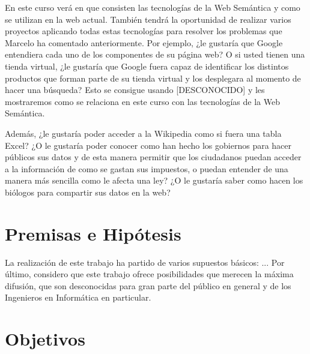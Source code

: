 
En este curso verá en que consisten las tecnologías de la Web Semántica y como se utilizan en la web actual. También tendrá la oportunidad de realizar varios proyectos aplicando todas estas tecnologías para resolver los problemas que Marcelo ha comentado anteriormente. Por ejemplo, ¿le gustaría que Google entendiera cada uno de los componentes de su página web? O si usted tienen una tienda virtual, ¿le gustaría que Google fuera capaz de identificar los distintos productos que forman parte de su tienda virtual y los desplegara al momento de hacer una búsqueda? Esto se consigue usando [DESCONOCIDO] y les mostraremos como se relaciona en este curso con las tecnologías de la Web Semántica.

Además, ¿le gustaría poder acceder a la Wikipedia como si fuera una tabla Excel? ¿O le gustaría poder conocer como han hecho los gobiernos para hacer públicos sus datos y de esta manera permitir que los ciudadanos puedan acceder a la información de como se gastan sus impuestos, o puedan entender de una manera más sencilla como le afecta una ley? ¿O le gustaría saber como hacen los biólogos para compartir sus datos en la web?


\section{Premisas e Hipótesis}


La realización de este trabajo ha partido de varios supuestos básicos: ... Por último, considero que este trabajo ofrece posibilidades que merecen la máxima difusión, que son desconocidas para gran parte del público en general y de los Ingenieros en Informática en particular.


\section{Objetivos}


